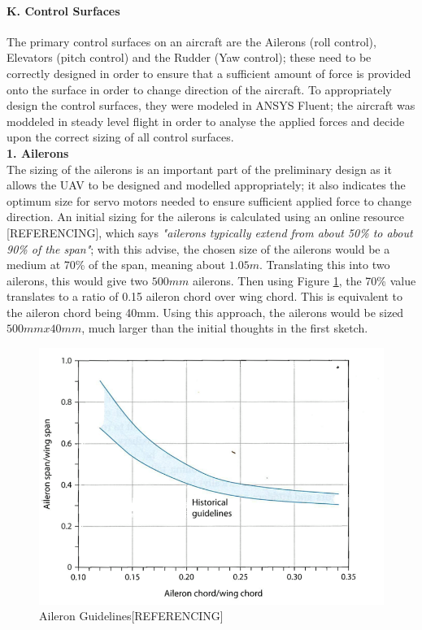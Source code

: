 \documentclass[12pt]{article}
\begin{document}
\paragraph{K. Control Surfaces} The primary control surfaces on an aircraft are the Ailerons (roll control), Elevators (pitch control) and the Rudder (Yaw control); these need to be correctly designed in order to ensure that a sufficient amount of force is provided onto the surface in order to change direction of the aircraft. To appropriately design the control surfaces, they were modeled in ANSYS Fluent; the aircraft was moddeled in steady level flight in order to analyse the applied forces and decide upon the correct sizing of all control surfaces. \\

\noindent \textbf{1. Ailerons} \\

\noindent The sizing of the ailerons is an important part of the preliminary design as it allows the UAV to be designed and modelled appropriately; it also indicates the optimum size for servo motors needed to ensure sufficient applied force to change direction. An initial sizing for the ailerons is calculated using an online resource [REFERENCING], which says \emph{"ailerons typically extend from about 50\% to about 90\% of the span"}; with this advise, the chosen size of the ailerons would be a medium at 70\% of the span, meaning about $1.05m$. Translating this into two ailerons, this would give two $500mm$ ailerons. Then using Figure \ref{fig:aileron}, the 70\% value translates to a ratio of 0.15 aileron chord over wing chord. This is equivalent to the aileron chord being 40mm. Using this approach, the ailerons would be sized $500mm x 40mm$, much larger than the initial thoughts in the first sketch.

\begin{figure}[H]
\includegraphics[width=13cm, scale=1]{aileron.png}
\caption{Aileron Guidelines[REFERENCING]}
\label{fig:aileron}
\end{figure}
\end{document}
